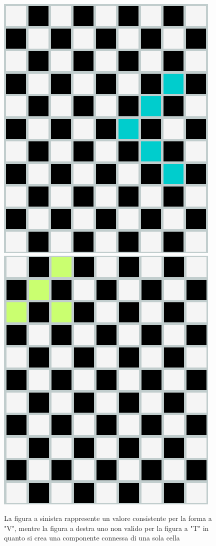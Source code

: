 \begin{figure}[h]
	\centering
	{\includegraphics[scale=0.35]{immagini/goodCC}}
	\hspace{5mm}
	{\includegraphics[scale=0.35]{immagini/badCC}}
	\caption{La figura a sinistra rappresente un valore consistente per la forma a "V", mentre la figura a destra uno non valido per la figura a "T" in quanto si crea una componente connessa di una sola cella}
	\label{fig:badCC}
\end{figure}


